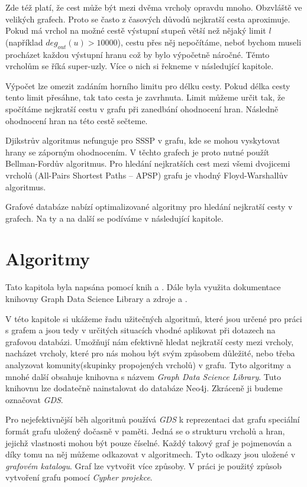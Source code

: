 \documentclass[
  program=infoi,
  biblatex=true,
  sourcecodes=true,
  figures=true,
  glossaries=false,
  index
]{kidiplom}
\begin{document}
Zde též platí, že cest může být mezi dvěma vrcholy opravdu mnoho. Obzvláště ve velikých grafech. Proto se často z časových důvodů nejkratší cesta aproximuje. Pokud má vrchol na možné cestě výstupní stupeň větší než nějaký limit $l$ (například $deg_{out}(u) > 10000$), cestu přes něj nepočítáme, neboť bychom museli procházet každou výstupní hranu což by bylo výpočetně náročné. Těmto vrcholům se říká super-uzly. Více o nich si řekneme v následující kapitole.

Výpočet lze omezit zadáním horního limitu pro délku cesty. Pokud délka cesty tento limit přesáhne, tak tato cesta je zavrhnuta. Limit můžeme určit tak, že spočítáme nejkratší cestu v grafu při zanedbání ohodnocení hran. Následně ohodnocení hran na této cestě sečteme.

Djikstrův algoritmus nefunguje pro SSSP v grafu, kde se mohou vyskytovat hrany se záporným ohodnocením. V těchto grafech je proto nutné použít Bellman-Fordův algoritmus. Pro hledání nejkratších cest mezi všemi dvojicemi vrcholů (All-Pairs Shortest Paths -- APSP) grafu je vhodný Floyd-Warshallův algoritmus.

Grafové databáze nabízí optimalizované algoritmy pro hledání nejkratší cesty v grafech. Na ty a na další se podíváme v následující kapitole.

\section{Algoritmy}

Tato kapitola byla napsána pomocí knih \cite{graphAlgorithms} a \cite{inAction}. Dále byla využita dokumentace knihovny Graph Data Science Library \cite{neo4jDoc} a zdroje \cite{astar} a \cite{disk}.

V této kapitole si ukážeme řadu užitečných algoritmů, které jsou určené pro práci s grafem a jsou tedy v určitých situacích vhodné aplikovat při dotazech na grafovou databázi. Umožňují nám efektivně hledat nejkratší cesty mezi vrcholy, nacházet vrcholy, které pro nás mohou být svým způsobem důležité, nebo třeba analyzovat komunity(skupinky propojených vrcholů) v grafu. Tyto algoritmy a mnohé další obsahuje knihovna s názvem \textit{Graph Data Science Library}. Tuto knihovnu lze dodatečně nainstalovat do databáze Neo4j. Zkráceně ji budeme označovat \textit{GDS}.

Pro nejefektivnější běh algoritmů používá \textit{GDS} k reprezentaci dat grafu speciální formát grafu uložený dočasně v paměti. Jedná se o strukturu vrcholů a hran, jejichž vlastnosti mohou být pouze číselné. Každý takový graf je pojmenován a díky tomu na něj můžeme odkazovat v algoritmech. Tyto odkazy jsou uložené v \textit{grafovém katalogu}. Graf lze vytvořit více způsoby. V práci je použitý způsob vytvoření grafu pomocí \textit{Cypher projekce}.
\end{document}
